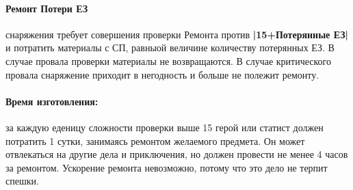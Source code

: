 \paragraph{Ремонт Потери ЕЗ} снаряжения требует совершения проверки Ремонта против \textbf{|15+Потерянные ЕЗ|} и потратить материалы с СП, равныой величине количеству потерянных ЕЗ. В случае провала проверки материалы не возвращаются. В случае критического провала снаряжение приходит в негодность и больше не полежит ремонту.
\paragraph{Время изготовления:} за каждую еденицу сложности проверки выше 15 герой или статист должен потратить 1 сутки, занимаясь ремонтом желаемого предмета. Он может отвлекаться на другие дела и приключения, но должен провести не менее 4 часов за ремонтом. Ускорение ремонта невозможно, потому что это дело не терпит спешки.
